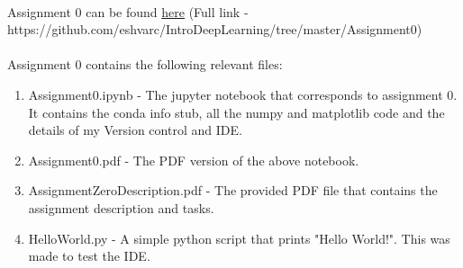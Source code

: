\documentclass[11pt]{article}
\begin{document}
\paragraph{} Assignment 0 can be found \href{https://github.com/eshvarc/IntroDeepLearning/tree/master/Assignment0}{here} \newline
(Full link - https://github.com/eshvarc/IntroDeepLearning/tree/master/Assignment0)

\paragraph{} Assignment 0 contains the following relevant files: 
\begin{enumerate}
    \item Assignment0.ipynb - The jupyter notebook that corresponds to assignment 0. It contains the conda info stub, all the numpy and matplotlib code and the details of my
Version control and IDE.
    \item Assignment0.pdf - The PDF version of the
above notebook. 
    \item AssignmentZeroDescription.pdf - The provided PDF file
that contains the assignment description and tasks.
    \item HelloWorld.py - A
simple python script that prints "Hello World!". This was made to test
the IDE.
\end{enumerate}


    
    
    
    
\end{document}
